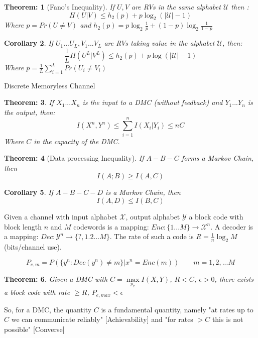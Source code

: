 \documentclass[11pt, a4paper]{scrartcl}
\newtheorem{theorem}{Theorem:}[section]
\newtheorem{corollary}[theorem]{Corollary}
\newenvironment{definition}[1][Definition]{\begin{trivlist}
\item[\hskip \labelsep {\bfseries #1}]}{\end{trivlist}}
\begin{document}
\begin{theorem} [Fano's Inequality]
If $U,V$ are RVs in the same alphabet $\mathcal{U}$ then : 
$$ H(U|V) \leq h_2(p) + p\log_2(|\mathcal U|-1) $$ Where $p= Pr(U\neq V)$ and $h_2(p) =p\log_2 \frac 1p + (1-p) \log_2 \frac 1{1-p}$
\end{theorem} 

\begin{corollary}
If $U_1...U_L, V_1...V_L$ are RVs taking value in the alphabet $\mathcal U$, then: 
$$\frac 1L H(U^L|V^L) \leq h_2(\overline p) +\overline p \log (|\mathcal U | -1) $$
Where $\overline p = \frac 1L \sum_{i=1}^L Pr(U_i \neq V_i)$
\end{corollary}

\begin{definition}[DMC] Discrete Memoryless Channel
\end{definition}


\begin{theorem} %
If $X_1... X_n$ is the input to a DMC (without feedback) and $Y_1...Y_n$ is the output, then: 
$$ I(X^n, Y^n) \leq \sum_{i=1}^n I(X_i|Y_i) \leq nC$$ Where $C$ in the capacity of the DMC.
\end{theorem}

\begin{theorem}[Data processing Inequality]
If $A-B-C$ forms a Markov Chain, then 
$$ I(A;B) \geq I(A,C) $$
\end{theorem}

\begin{corollary}
If $A-B-C-D$ is a Markov Chain, then 
$$I(A,D) \leq I(B,C)$$
\end{corollary}

\begin{definition}[Block Codes]
Given a channel with input alphabet $\mathcal{X}$, output alphabet $\mathcal Y$ a block code with block length $n$ and $M$ codewords is a mapping: $Enc:\{1...M\} \to \mathcal X ^n$. A decoder is a mapping: $Dec:\mathcal Y^n \to \{?,1.2...M\}$. The rate of such a code is $R=\frac 1n \log_2 M$ (bits/channel use). 
\end{definition}

\begin{definition} [Probability of error for a message M]
$$ P_{e,m} = P(\{y^n:Dec(y^n) \neq m \} |x^n = Enc(m)) \qquad m=1,2,...M $$
\end{definition}

\begin{theorem}
Given a DMC with $C=\underset{p_x}{\max} I(X,Y)$, $R<C$, $\epsilon >0$, there exists a block code with rate $\geq R$, $P_{e, max} <\epsilon $
\end{theorem}
So, for a DMC, the quantity $C$ is a fundamental quantity, namely "at rates up to $C$ we can communicate reliably" [Achievability] and "for rates $>C$ this is not possible" [Converse]
\end{document}
